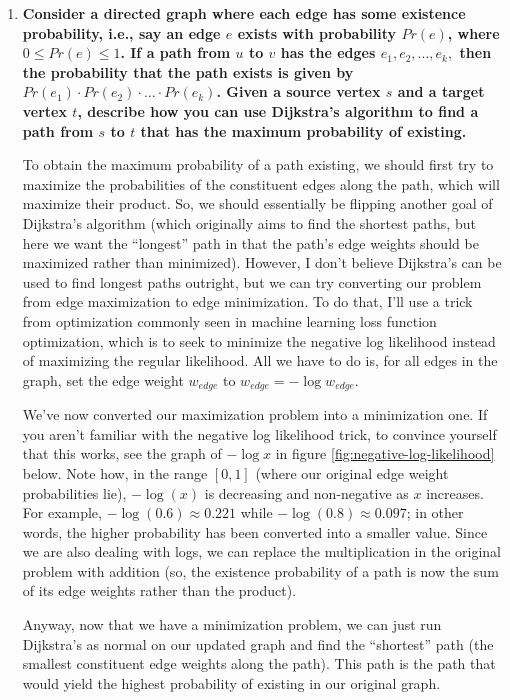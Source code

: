 \documentclass[12pt]{article}
\begin{document}
\begin{enumerate}
        \item \textbf{Consider a directed graph where each edge has some existence probability, i.e., say an edge $e$ 
        exists with probability $Pr(e)$, where $0 \leq Pr(e) \leq 1$. If a path from $u$ to $v$ has the edges 
        $e_1, e_2, ..., e_k, $ then the probability that the path exists is given by $Pr(e_1) \cdot Pr(e_2) \cdot ... 
        \cdot Pr(e_k)$. Given a source vertex $s$ and a target vertex $t$, describe how you can use Dijkstra's algorithm 
        to find a path from $s$ to $t$ that has the maximum probability of existing.}

        To obtain the maximum probability of a path existing, we should first try to maximize the probabilities of the 
        constituent edges along the path, which will maximize their product. So, we should essentially be flipping another goal of 
        Dijkstra's algorithm (which originally aims to find the shortest paths, but here we want the ``longest'' path in 
        that the path's edge weights should be maximized rather than minimized). However, I don't believe Dijkstra's can be used 
        to find longest paths outright, but we can try converting our problem from edge maximization to edge minimization. 
        To do that, I'll use a trick from optimization commonly seen in machine learning loss function optimization, which is 
        to seek to minimize the negative log likelihood instead of maximizing the regular likelihood. All we have to do is, for all edges 
        in the graph, set the edge weight $w_{edge}$ to $w_{edge} = -\log w_{edge}$.

        We've now converted our maximization problem into a minimization one. If you aren't familiar with the negative 
        log likelihood trick, to convince yourself that this works, see the graph of $-\log x$ in figure 
        \ref{fig:negative-log-likelihood} below. Note how, in the range $[0, 1]$ (where our original edge weight probabilities 
        lie), $-\log (x)$ is decreasing and non-negative as $x$ increases. For example, $-\log (0.6) \approx 0.221$ while $-\log (0.8) \approx 0.097$; 
        in other words, the higher probability has been converted into a smaller value. Since we are also dealing with logs, 
        we can replace the multiplication in the original problem with addition (so, the existence probability of a path 
        is now the sum of its edge weights rather than the product).
        
        Anyway, now that we have a minimization problem, we can just run Dijkstra's as normal on our updated graph and 
        find the ``shortest'' path (the smallest constituent edge weights along the path). This path is the path that 
        would yield the highest probability of existing in our original graph.


\end{enumerate}
\end{document}
